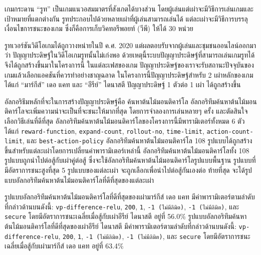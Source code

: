 \maketitle
\makesignature

\ifproject
\begin{abstractTH}
เกมกระดาน ``รูท'' เป็นเกมแนวอสมมาตรที่สังเกตได้บางส่วน โดยผู้เล่นแต่เผ่าจะมีวิธีการเล่นเกมและเป้าหมายที่แตกต่างกัน รูทประกอบไปด้วยหลายเผ่าที่ผู้เล่นสามารถเล่นได้ แต่ละเผ่าจะมีวิธีการบรรลุเงื่อนไขการชนะของเกม ซึ่งก็คือการเก็บวิคทอรีพอยท์ (วีพี) ให้ได้ 30 หน่วย

รูทเวอร์ชันวิดีโอเกมได้ถูกวางหน่ายในปี ค.ศ. 2020 แต่ผลตอบรับจากผู้เล่นและชุมชนออนไลน์ออกมาว่า ปัญญาประดิษฐ์ในวิดีโอเกมรูทนั้นไม่เก่งพอ ด้วยเหตุนี้ระบบปัญญาประดิษฐ์ที่สามารถเล่นเกมรูทได้ จึงได้ถูกสร้างขึ้นมาในโครงการนี้ ในแต่ละเฟสของเกม ปัญญาประดิษฐ์ของเราจะรับสถานะปัจจุบันของเกมแล้วเลือกแอคชันที่ควรทำอย่างชาญฉลาด ในโครงการนี้ปัญญาประดิษฐ์สำหรับ 2 เผ่าหลักของเกม ได้แก่ ``มาร์กีส์'' เดอ แคท และ ``อีรีย์'' ไดนาสตี ปัญญาประดิษฐ์ 1 ตัวต่อ 1 เผ่า ได้ถูกสร้างขึ้น 

อัลกอริธึมหลักที่จะในการสร้างปัญญาประดิษฐ์คือ ค้นหาต้นไม้มอนติคาร์โล อัลกอริทึมค้นหาต้นไม้มอนติคาร์โลจะเพิ่มความน่าจะเป็นที่จะชนะให้มากที่สุด โดยการจำลองการเล่นหลายๆ ครั้ง และตัดสินใจเลือกวิธีเล่นที่ดีที่สุด อัลกอริทึมค้นหาต้นไม้มอนติคาร์โลของโครงการนี้มีพารามิเตอร์ทั้งหมด 6 ตัว ได้แก่ \texttt{reward-function}, \texttt{expand-count}, \texttt{rollout-no}, \texttt{time-limit}, \texttt{action-count-limit}, และ \texttt{best-action-policy} อัลกอริทึมค้นหาต้นไม้มอนติคาร์โล 108 รูปแบบได้ถูกสร้างขึ้นสำหรับแต่ละเผ่าโดยการเปลี่ยนค่าพารามิเตอร์เหล่านี้ อัลกอริทึมค้นหาต้นไม้มอนติคาร์โลทั้ง 108 รูปแบบถูกนำไปต่อสู้กับเผ่าคู่ต่อสู้ ซึ่งจะใช้อัลกอริทึมค้นหาต้นไม้มอนติคาร์โลรูปแบบพื้นฐาน รูปแบบที่มีอัตราการชนะสูงที่สุด 5 รูปแบบของแต่ละเผ่า จะถูกเลือกเพื่อนำไปต่อสู้กันเองต่อ ท้ายที่สุด จะได้รูปแบบอัลกอริทึมค้นหาต้นไม้มอนติคาร์โลที่ดีที่สุดของแต่ละเผ่า

รูปแบบอัลกอริทึมค้นหาต้นไม้มอนติคาร์โลที่ดีที่สุดของเผ่ามาร์กีส์ เดอ แคท มีค่าพารามิเตอร์ตามลำดับที่กล่าวด้านบนดังนี้: \texttt{vp-difference-relu}, \texttt{200}, \texttt{1}, \texttt{-1 (ไม่มีลิมิต)}, \texttt{-1 (ไม่มีลิมิต)}, และ \texttt{secure} โดยมีอัตราการชนะเฉลี่ยเมื่อสู้กับเผ่าอีรีย์ ไดนาสตี อยู่ที่ 56.0\% รูปแบบอัลกอริทึมค้นหาต้นไม้มอนติคาร์โลที่ดีที่สุดของเผ่าอีรีย์ ไดนาสตี มีค่าพารามิเตอร์ตามลำดับที่กล่าวด้านบนดังนี้: \texttt{vp-difference-relu}, \texttt{200}, \texttt{1}, \texttt{-1 (ไม่มีลิมิต)}, \texttt{-1 (ไม่มีลิมิต)}, และ \texttt{secure} โดยมีอัตราการชนะเฉลี่ยเมื่อสู้กับเผ่ามาร์กีส์ เดอ แคท อยู่ที่ 63.4\%


\end{abstractTH}
